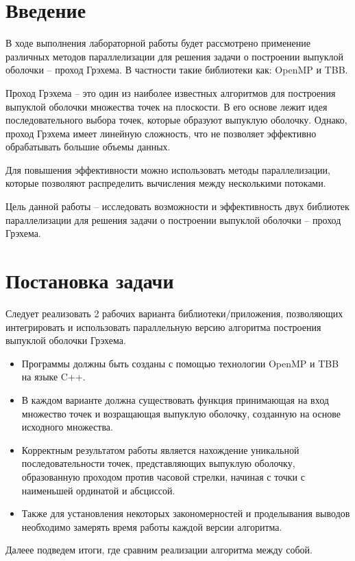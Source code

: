 \documentclass[14pt, a4paper]{extarticle}
\begin{document}
  \tableofcontents
  \thispagestyle{empty}
  \newpage

  \pagestyle{plain}
  \setcounter{page}{3}

  \section{Введение}
     В ходе выполнения лабораторной работы будет рассмотрено применение различных методов параллелизации для решения задачи о построении выпуклой оболочки – проход Грэхема. В частности такие библиотеки как: OpenMP и TBB.

    Проход Грэхема – это один из наиболее известных алгоритмов для построения выпуклой оболочки множества точек на плоскости. В его основе лежит идея последовательного выбора точек, которые образуют выпуклую оболочку. Однако, проход Грэхема имеет линейную сложность, что не позволяет эффективно обрабатывать большие объемы данных.
    
    Для повышения эффективности можно использовать методы параллелизации, которые позволяют распределить вычисления между несколькими потоками.
    
    Цель данной работы – исследовать возможности и эффективность двух библиотек параллелизации для решения задачи о построении выпуклой оболочки – проход Грэхема.
  \newpage

  \section{Постановка задачи}
  Следует реализовать 2 рабочих варианта библиотеки/приложения, позволяющих интегрировать и использовать параллельную версию алгоритма построения выпуклой оболочки Грэхема.
    \begin{itemize}
      \item Программы должны быть созданы с помощью технологии OpenMP и TBB на языке C++.
        \item В каждом варианте должна существовать функция принимающая на вход множество точек и возращающая выпуклую оболочку, созданную на основе исходного множества.
        \item Корректным результатом работы является нахождение уникальной последовательности точек, представляющих выпуклую оболочку, образованную проходом против часовой стрелки, начиная с точки с наименьшей ординатой и абсциссой.
        \item Также для установления некоторых закономерностей и проделывания выводов необходимо замерять время работы каждой версии алгоритма.
    \end{itemize}
  Далеее подведем итоги, где сравним реализации алгоритма между собой.
  \newpage
\end{document}
